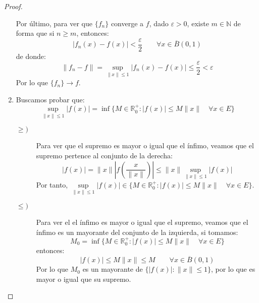 \begin{prop}
\begin{proof}
\begin{enumerate}
                Por último, para ver que $\{f_n\}$ converge a $f$, dado $\varepsilon>0$, existe $m\in \mathbb{N}$ de forma que si $n\geq m$, entonces:
                \begin{equation*}
                    |f_n(x) - f(x)| < \dfrac{\varepsilon}{2} \qquad \forall x\in \overline{B}(0,1)
                \end{equation*}
                de donde:
                \begin{equation*}
                    \|f_n - f\| = \sup_{\|x\|\leq 1} |f_n(x) - f(x)| \leq \dfrac{\varepsilon}{2} < \varepsilon
                \end{equation*}
                Por lo que $\{f_n\}\to f$.
            \item Buscamos probar que:
                \begin{equation*}
                    \sup_{\|x\|\leq 1}|f(x)| = \inf\{M\in \mathbb{R}^+_0 : |f(x)| \leq M\|x\| \quad \forall x\in E\}
                \end{equation*}
                \begin{description}
                    \item [$\geq)$] Para ver que el supremo es mayor o igual que el ínfimo, veamos que el supremo pertence al conjunto de la derecha:
                        \begin{equation*}
                            |f(x)| = \|x\| \left|f\left(\dfrac{x}{\|x\|}\right)\right| \leq \|x\| \sup_{\|x\|\leq 1}|f(x)|
                        \end{equation*}
                        Por tanto, $\sup\limits_{\|x\|\leq1}|f(x)| \in \{M\in \mathbb{R}^+_0 : |f(x)|\leq M\|x\| \quad \forall x\in E\}$.
                    \item [$\leq)$] Para ver el el ínfimo es mayor o igual que el supremo, veamos que el ínfimo es un mayorante del conjunto de la izquierda, si tomamos:
                        \begin{equation*}
                            M_0 = \inf\{M\in \mathbb{R}^+_0 : |f(x)| \leq M\|x\| \quad \forall x\in E\}
                        \end{equation*}
                        entonces:
                        \begin{equation*}
                            |f(x)| \leq M\|x\| \leq M  \qquad \forall x\in \overline{B}(0,1)
                        \end{equation*}
                        Por lo que $M_0$ es un mayorante de $\{|f(x)| : \|x\| \leq 1\}$, por lo que es mayor o igual que su supremo.
                \end{description}
        \end{enumerate}
    \end{proof}
\end{prop}

